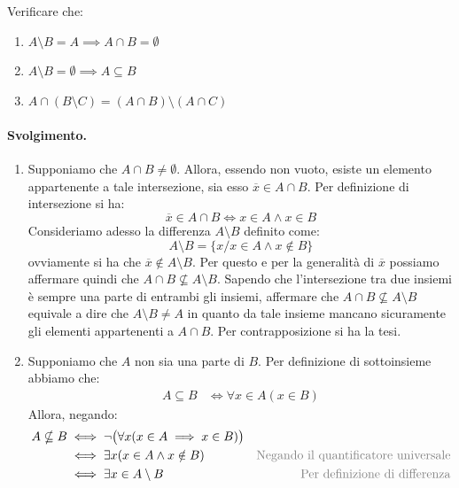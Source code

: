 \begin{exsbox}
	Verificare che:
	\begin{enumerate}
		\item $A \setminus B = A \implies A \cap B = \emptyset$
		\item $A \setminus B = \emptyset \implies A \subseteq B$
		\item $A \cap ( B \setminus C) = (A \cap B) \setminus (A \cap C)$
	\end{enumerate}
\end{exsbox}
\paragraph{Svolgimento.}
\begin{enumerate}
	\item Supponiamo che $A \cap B \neq \emptyset$. Allora, essendo non vuoto, esiste un elemento appartenente a tale intersezione, sia esso $\overline{x} \in A \cap B$. Per definizione di intersezione si ha:
	\begin{displaymath}
		\overline{x} \in A \cap B \iff x \in A \land x \in B
	\end{displaymath}
	Consideriamo adesso la differenza $A \setminus B$ definito come:
	\begin{displaymath}
		A \setminus B = \{x / x \in A \land x \notin B \}
	\end{displaymath}
	ovviamente si ha che $\overline{x} \notin A \setminus B$. Per questo e per la generalità di $\overline{x}$ possiamo affermare quindi che $A \cap B \nsubseteq A \setminus B$. Sapendo che l'intersezione tra due insiemi è sempre una parte di entrambi gli insiemi, affermare che $A \cap B \nsubseteq A \setminus B$ equivale a dire che $A \setminus B \neq A$ in quanto da tale insieme mancano sicuramente gli elementi appartenenti a $A \cap B$. Per contrapposizione si ha la tesi.
	\item Supponiamo che $A$ non sia una parte di $B$. Per definizione di sottoinsieme abbiamo che:
	\begin{align}
		A \subseteq B &\iff \forall x \in A (x \in B)
	\end{align}
	Allora, negando:
	\begin{align*}
		A \nsubseteq B &\iff \neg \bigl(\forall x (x \in A \implies x \in B)\bigr)\\
		&\iff \exists x ( x \in A \land x \notin B) & \text{\textcolor{gray}{Negando il quantificatore universale}} \\
		&\iff \exists x \in A \setminus B & \text{\textcolor{gray}{Per definizione di differenza}} \\

\end{align*}
\end{enumerate}
